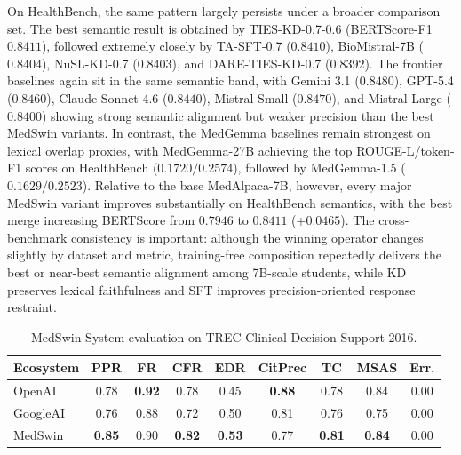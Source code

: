 \documentclass[conference]{IEEEtran}
\begin{document}
On HealthBench, the same pattern largely persists under a broader comparison set. The best semantic result is obtained by TIES-KD-0.7-0.6 (BERTScore-F1 $0.8411$), followed extremely closely by TA-SFT-0.7 ($0.8410$), BioMistral-7B ($0.8404$), NuSL-KD-0.7 ($0.8403$), and DARE-TIES-KD-0.7 ($0.8392$). The frontier baselines again sit in the same semantic band, with Gemini 3.1 ($0.8480$), GPT-5.4 ($0.8460$), Claude Sonnet 4.6 ($0.8440$), Mistral Small ($0.8470$), and Mistral Large ($0.8400$) showing strong semantic alignment but weaker precision than the best MedSwin variants. In contrast, the MedGemma baselines remain strongest on lexical overlap proxies, with MedGemma-27B achieving the top ROUGE-L/token-F1 scores on HealthBench ($0.1720/0.2574$), followed by MedGemma-1.5 ($0.1629/0.2523$). Relative to the base MedAlpaca-7B, however, every major MedSwin variant improves substantially on HealthBench semantics, with the best merge increasing BERTScore from $0.7946$ to $0.8411$ (+$0.0465$). The cross-benchmark consistency is important: although the winning operator changes slightly by dataset and metric, training-free composition repeatedly delivers the best or near-best semantic alignment among 7B-scale students, while KD preserves lexical faithfulness and SFT improves precision-oriented response restraint.

\begin{table}[h!]
\centering
\caption{MedSwin System evaluation on TREC Clinical Decision Support 2016.}
\label{tab:trec_cds_system_audit}
\scriptsize
\begin{tabular}{lcccccccc}
\toprule
\textbf{Ecosystem} 
& \textbf{PPR} 
& \textbf{FR} 
& \textbf{CFR} 
& \textbf{EDR} 
& \textbf{CitPrec} 
& \textbf{TC} 
& \textbf{MSAS} 
& \textbf{Err.} \\
\midrule
OpenAI\footnotemark
& 0.78 & \textbf{0.92} & 0.78 & 0.45 & \textbf{0.88} & 0.78 & 0.84 & 0.00 \\
GoogleAI\footnotemark
& 0.76 & 0.88 & 0.72 & 0.50 & 0.81 & 0.76 & 0.75 & 0.00 \\
MedSwin\footnotemark
& \textbf{0.85} & 0.90 & \textbf{0.82} & \textbf{0.53} & 0.77 & \textbf{0.81} & \textbf{0.84} & 0.00 \\
\bottomrule
\end{tabular}
\vspace{-0.5em}
\end{table}

\end{document}
